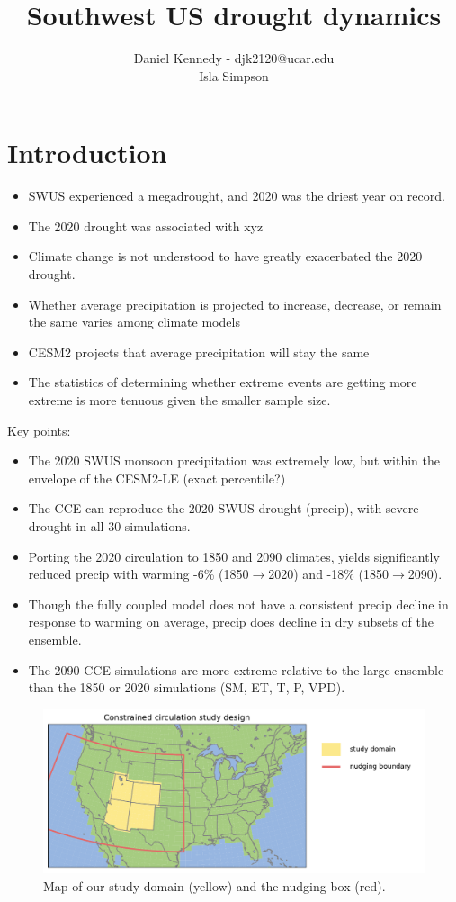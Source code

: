\documentclass[11pt]{article}
\title{Southwest US drought dynamics \large \\}
\author{Daniel Kennedy - djk2120@ucar.edu \\ Isla Simpson }
\begin{document}
\maketitle

\section{Introduction}

\begin{itemize}
    \item SWUS experienced a megadrought, and 2020 was the driest year on record.
    \item The 2020 drought was associated with xyz
    \item Climate change is not understood to have greatly exacerbated the 2020 drought.
    \item Whether average precipitation is projected to increase, decrease, or remain the same varies among climate models
    \item CESM2 projects that average precipitation will stay the same
    \item The statistics of determining whether extreme events are getting more extreme is more tenuous given the smaller sample size.
\end{itemize}

\newpage
Key points:
\begin{itemize}
\item The 2020 SWUS monsoon precipitation was extremely low, but within the envelope of the CESM2-LE (exact percentile?)
\item The CCE can reproduce the 2020 SWUS drought (precip), with severe drought in all 30 simulations.
\item Porting the 2020 circulation to 1850 and 2090 climates, yields significantly reduced precip with warming -6\% (1850$\rightarrow$2020) and -18\% (1850$\rightarrow$2090).
\item Though the fully coupled model does not have a consistent precip decline in response to warming on average, precip does decline in dry subsets of the ensemble.
\item The 2090 CCE simulations are more extreme relative to the large ensemble than the 1850 or 2020 simulations (SM, ET, T, P, VPD).
\end{itemize}



\begin{figure}[h]
\centering
\includegraphics[width=30pc]{figs/domain.pdf}
\caption{Map of our study domain (yellow) and the nudging box (red).}
\label{fig:domain}
\end{figure}
\end{document}
